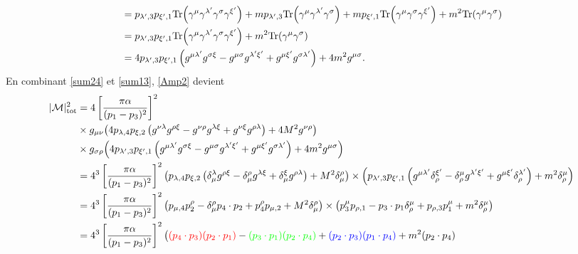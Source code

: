 {\begin{alphaparts}
\begin{align}
        &=  p_{\lambda', 3}p_{\xi', 1} \text{Tr}\qty(\gamma^\mu\gamma^{\lambda'} \gamma^\sigma \gamma^{\xi'}) + m p_{\lambda', 3} \text{Tr}\qty(\gamma^\mu \gamma^{\lambda'} \gamma^\sigma) + m p_{\xi', 1} \text{Tr}\qty(\gamma^\mu \gamma^\sigma \gamma^{\xi'}) + m^2 \text{Tr}\qty(\gamma^\mu \gamma^\sigma)\nonumber\\
        &= p_{\lambda', 3}p_{\xi', 1} \text{Tr}\qty(\gamma^\mu\gamma^{\lambda'} \gamma^\sigma \gamma^{\xi'}) + m^2 \text{Tr}\qty(\gamma^\mu \gamma^\sigma) \nonumber\\
        &= 4 p_{\lambda', 3}p_{\xi', 1} \left(g^{\mu \lambda'} g^{\sigma \xi}-g^{\mu \sigma} g^{\lambda' \xi'}+g^{\mu \xi'} g^{\sigma \lambda'}\right) + 4 m^2 g^{\mu \sigma}.\label{sum13}
    \end{align}
    En combinant \eqref{sum24} et \eqref{sum13}, \eqref{Amp2} devient 
    \begin{align}
        |\mathcal{M}|_{\text{tot}}^2 
        &= 4\left[\dfrac{\pi \alpha }{(p_1 - p_3)^2}\right]^2   \nonumber \\
        &\times g_{\mu \nu}\qty(4 p_{\lambda, 4}p_{\xi, 2} \left(g^{\nu \lambda} g^{\rho \xi}-g^{\nu \rho} g^{\lambda \xi}+g^{\nu \xi} g^{\rho \lambda}\right) + 4 M^2 g^{\nu \rho})\nonumber\\&\times g_{\sigma \rho}\qty(4 p_{\lambda', 3}p_{\xi', 1} \left(g^{\mu \lambda'} g^{\sigma \xi}-g^{\mu \sigma} g^{\lambda' \xi'}+g^{\mu \xi'} g^{\sigma \lambda'}\right) + 4 m^2 g^{\mu \sigma})\nonumber\\
        &= 4^3\left[\dfrac{\pi \alpha }{(p_1 - p_3)^2}\right]^2 \qty( p_{\lambda, 4}p_{\xi, 2} \left(\delta_{\mu}^{\lambda} g^{\rho \xi}-\delta_{\mu}^{\rho} g^{\lambda \xi}+\delta_{\mu}^{\xi} g^{\rho \lambda}\right) + M^2 \delta_{\mu}^{\rho})\times \qty(p_{\lambda', 3}p_{\xi', 1} \left(g^{\mu \lambda'} \delta_{\rho}^{\xi'}-\delta_{\rho}^{\mu} g^{\lambda' \xi'}+g^{\mu \xi'} \delta_{\rho}^{\lambda'}\right) + m^2 \delta_{\rho}^{\mu}) \nonumber\\
        &= 4^3\left[\dfrac{\pi \alpha}{(p_1 - p_3)^2}\right]^2 \qty( p_{\mu, 4}p_{2}^\rho -\delta_{\mu}^{\rho} p_{4} \cdot p_{2}+p_{4}^\rho p_{\mu, 2} +  M^2 \delta_{\mu}^{\rho})\times \qty(p_{3}^\mu p_{\rho, 1} -p_{3} \cdot p_{1}\delta_{\rho}^{\mu} + p_{\rho, 3}p_{1}^{\mu} +  m^2 \delta_{\rho}^{\mu})\nonumber\\
        &= 4^3\left[\dfrac{\pi \alpha}{(p_1 - p_3)^2}\right]^2 
        \nonumber\big( 
        \textcolor{red}{(p_{4} \cdot p_3) (p_{2}\cdot p_1)} - \textcolor{green}{(p_{3} \cdot p_{1})(p_2 \cdot p_4)}+  \textcolor{blue}{(p_2 \cdot p_3)(p_1 \cdot p_4)} +  m^2 (p_2 \cdot p_4)\nonumber\\&

\end{align}
\end{alphaparts}}
